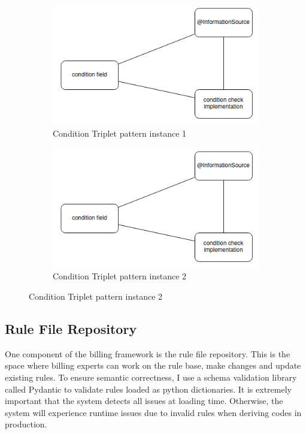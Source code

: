 \begin{figure}
    \centering
    \begin{subfigure}[b]{0.45\linewidth}
        \centering
        \includegraphics[width=\linewidth]{./figures/condition-triplet-pattern}
        \caption{Condition Triplet pattern instance 1}
        \label{fig:condition-triplet-pattern-instance-1}
    \end{subfigure}
    \hspace{5mm} %
    \begin{subfigure}[b]{0.45\linewidth}
        \centering
        \includegraphics[width=\linewidth]{./figures/condition-triplet-pattern}
        \caption{Condition Triplet pattern instance 2}
        \label{fig:condition-triplet-pattern-instance-2}
    \end{subfigure}
    \label{fig:coffee}
\end{figure}



\subsection{Rule File Repository}
One component of the billing framework is the rule file repository.
This is the space where billing experts can work on the rule base, make changes and update existing rules.
To ensure semantic correctness, I use a schema validation library called Pydantic to validate rules loaded as python dictionaries.
It is extremely important that the system detects all issues at loading time.
Otherwise, the system will experience runtime issues due to invalid rules when deriving codes in production.


